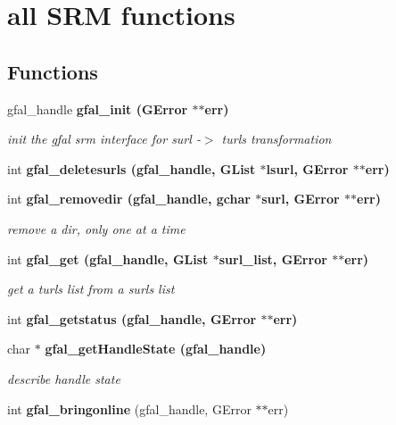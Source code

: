 \section{all SRM functions}
\label{group__srm__group}
\subsection*{Functions}
\begin{CompactItemize}
\item 
gfal\_\-handle \bf{gfal\_\-init} (GError $\ast$$\ast$err)\label{group__srm__group_g0cdadb4ebbaac57afd72c2369f8ac2ef}

\begin{CompactList}\small\item\em init the gfal srm interface for surl -$>$ turls transformation \item\end{CompactList}\item 
int \bf{gfal\_\-deletesurls} (gfal\_\-handle, GList $\ast$lsurl, GError $\ast$$\ast$err)
\item 
int \bf{gfal\_\-removedir} (gfal\_\-handle, gchar $\ast$surl, GError $\ast$$\ast$err)\label{group__srm__group_g5c1b039985488235931ecea769bc7fb1}

\begin{CompactList}\small\item\em remove a dir, only one at a time \item\end{CompactList}\item 
int \bf{gfal\_\-get} (gfal\_\-handle, GList $\ast$surl\_\-list, GError $\ast$$\ast$err)
\begin{CompactList}\small\item\em get a turls list from a surls list \item\end{CompactList}\item 
int \bf{gfal\_\-getstatus} (gfal\_\-handle, GError $\ast$$\ast$err)
\item 
char $\ast$ \bf{gfal\_\-get\-Handle\-State} (gfal\_\-handle)
\begin{CompactList}\small\item\em describe handle state \item\end{CompactList}\item 
int \textbf{gfal\_\-bringonline} (gfal\_\-handle, GError $\ast$$\ast$err)\label{group__srm__group_g8df147aadc31a312b25c40fc9a3df77f}


\end{CompactItemize}
